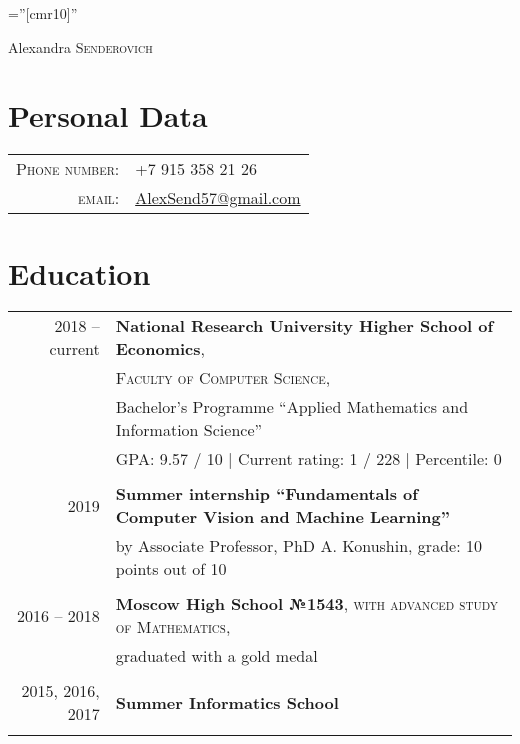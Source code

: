 \documentclass[a4paper,10pt]{article}
\begin{document}

\pagestyle{empty} %

\font\fb=''[cmr10]'' %

\par{\centering
		{\Huge Alexandra \textsc{Senderovich}
	}\bigskip\par}

\section{Personal Data}

\begin{tabular}{rl}
    \textsc{Phone number:}     & +7 915 358 21 26\\
    \textsc{email:}     & \href{mailto:AlexSend57@gmail.com}{AlexSend57@gmail.com}
\end{tabular}

\section{Education}
\begin{tabular}{rl}	
2018 -- current & \textbf{National Research University Higher School of Economics}, \\ & \textsc{Faculty of Computer Science}, \\ & Bachelor’s Programme ``Applied Mathematics and Information Science''\\
& GPA: 9.57 / 10 | Current rating: 1 / 228 | Percentile: 0 \\
&\\
2019 & \textbf{Summer internship ``Fundamentals of Computer Vision and Machine Learning''} \\
& by Associate Professor, PhD A. Konushin, grade: 10 points out of 10 \\
&\\

2016 -- 2018 & \textbf{Moscow High School №1543}, \textsc{with advanced study of Mathematics}, \\
& graduated with a gold medal \\
&\\

2015, 2016, 2017 & \textbf{Summer Informatics School}\\
&\\
\end{tabular}
\end{document}
